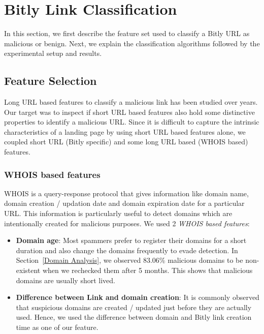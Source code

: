 \documentclass[conference]{IEEEtran}
\begin{document}
\section{Bitly Link Classification}
\vspace{4pt}
In this section, we first describe the feature set used to classify a Bitly URL as malicious or benign. Next, we explain the classification algorithms followed by the experimental setup and results.
\subsection{Feature Selection}\label{Feature Selection for Malicious Bitly URL Detection}
Long URL based features to classify a malicious link has been studied over years. Our target was to inspect if short URL based features also hold some distinctive properties to identify a malicious URL. Since it is difficult to capture the intrinsic characteristics of a landing page by using short URL based features alone, we coupled short URL (Bitly specific) and some long URL based (WHOIS based) features. 
\subsubsection{WHOIS based features}
WHOIS is a query-response protocol that gives information like domain name, domain creation / updation date and domain expiration date for a particular URL. This information is particularly useful to detect domains which are intentionally created for malicious purposes. We used 2 \textit{WHOIS based features}:
\begin{itemize}[leftmargin=0.4cm]
 \item {\bf Domain age}: Most spammers prefer to register their domains for a short duration and also change the domains frequently to evade detection. In Section~\ref{Domain Analysis}, we observed 83.06\% malicious domains to be non-existent when we rechecked them after 5 months. This shows that malicious domains are usually short lived.
 \item {\bf Difference between Link and domain creation}: It is commonly observed that suspicious domains are created / updated just before they are actually used. Hence, we used the difference between domain and Bitly link creation time as one of our feature.
\end{itemize}
\end{document}
